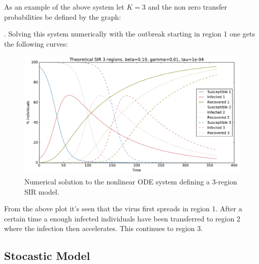 As an example of the above system let $K=3$ and the non zero transfer probabilities be defined by the graph:
\begin{figure}[H]
	\centering
{}
\end{figure}
. Solving this system numerically with the outbreak starting in region 1 one gets the following curves:
\begin{figure}[H]
	\centering
	\includegraphics[width= 1.0 \linewidth]{plots/sir_three_region_theory.pdf}
	\caption{Numerical solution to the nonlinear ODE system defining a 3-region SIR model.}
\end{figure}

From the above plot it's seen that the virus first spreads in region 1. After a certain time a enough infected individuals have been transferred to region 2 where the infection then accelerates. This continues to region 3.

\subsection{Stocastic Model}

